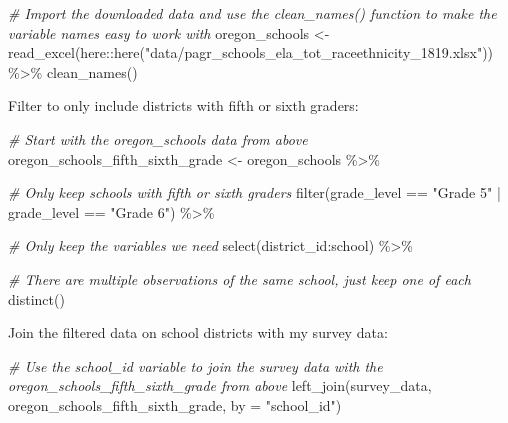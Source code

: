 \documentclass[
]{book}
\newenvironment{Shaded}{\begin{snugshade}}{\end{snugshade}}
\newcommand{\AttributeTok}[1]{\textcolor[rgb]{0.77,0.63,0.00}{#1}}
\newcommand{\CommentTok}[1]{\textcolor[rgb]{0.56,0.35,0.01}{\textit{#1}}}
\newcommand{\FunctionTok}[1]{\textcolor[rgb]{0.00,0.00,0.00}{#1}}
\newcommand{\NormalTok}[1]{#1}
\newcommand{\OtherTok}[1]{\textcolor[rgb]{0.56,0.35,0.01}{#1}}
\newcommand{\SpecialCharTok}[1]{\textcolor[rgb]{0.00,0.00,0.00}{#1}}
\newcommand{\StringTok}[1]{\textcolor[rgb]{0.31,0.60,0.02}{#1}}
\begin{document}
\begin{Shaded}
\begin{Highlighting}[]
\CommentTok{\# Import the downloaded data and use the \textasciigrave{}clean\_names()\textasciigrave{} function to make the variable names easy to work with}
\NormalTok{oregon\_schools }\OtherTok{\textless{}{-}} \FunctionTok{read\_excel}\NormalTok{(here}\SpecialCharTok{::}\FunctionTok{here}\NormalTok{(}\StringTok{"data/pagr\_schools\_ela\_tot\_raceethnicity\_1819.xlsx"}\NormalTok{)) }\SpecialCharTok{\%\textgreater{}\%} 
  \FunctionTok{clean\_names}\NormalTok{()}
\end{Highlighting}
\end{Shaded}

Filter to only include districts with fifth or sixth graders:

\begin{Shaded}
\begin{Highlighting}[]
\CommentTok{\# Start with the oregon\_schools data from above}
\NormalTok{oregon\_schools\_fifth\_sixth\_grade }\OtherTok{\textless{}{-}}\NormalTok{ oregon\_schools }\SpecialCharTok{\%\textgreater{}\%} 
  
  \CommentTok{\# Only keep schools with fifth or sixth graders}
  \FunctionTok{filter}\NormalTok{(grade\_level }\SpecialCharTok{==} \StringTok{"Grade 5"} \SpecialCharTok{|}\NormalTok{ grade\_level }\SpecialCharTok{==} \StringTok{"Grade 6"}\NormalTok{) }\SpecialCharTok{\%\textgreater{}\%} 
  
  \CommentTok{\# Only keep the variables we need}
  \FunctionTok{select}\NormalTok{(district\_id}\SpecialCharTok{:}\NormalTok{school) }\SpecialCharTok{\%\textgreater{}\%} 
  
  \CommentTok{\# There are multiple observations of the same school, just keep one of each}
  \FunctionTok{distinct}\NormalTok{()}
\end{Highlighting}
\end{Shaded}

Join the filtered data on school districts with my survey data:

\begin{Shaded}
\begin{Highlighting}[]
\CommentTok{\# Use the school\_id variable to join the survey data with the oregon\_schools\_fifth\_sixth\_grade from above }
\FunctionTok{left\_join}\NormalTok{(survey\_data, oregon\_schools\_fifth\_sixth\_grade,}
          \AttributeTok{by =} \StringTok{"school\_id"}\NormalTok{)}
\end{Highlighting}
\end{Shaded}
\end{document}
